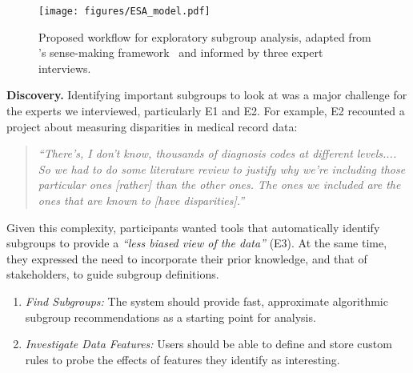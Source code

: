 \begin{figure}
    \centering
    \texttt{[image: figures/ESA\_model.pdf]}
    \caption{Proposed workflow for exploratory subgroup analysis, adapted from \citeauthor{pirolli_sensemaking_2005}'s sense-making framework~\cite{pirolli_sensemaking_2005} and informed by three expert interviews.}
    \label{fig:esa-model}
\end{figure}

\textbf{Discovery.} Identifying important subgroups to look at was a major challenge for the experts we interviewed, particularly E1 and E2.
For example, E2 recounted a project about measuring disparities in medical record data:
\begin{quote}
\textit{``There's, I don't know, thousands of diagnosis codes at different levels.... So we had to do some literature review to justify why we're including those particular ones [rather] than the other ones. The ones we included are the ones that are known to [have disparities].''}
\end{quote}
Given this complexity, participants wanted tools that automatically identify subgroups to provide a \textit{``less biased view of the data''} (E3).
At the same time, they expressed the need to incorporate their prior knowledge, and that of stakeholders, to guide subgroup definitions.

\begin{enumerate}[label={\bfseries T\arabic*.}, ref={\bfseries T\arabic*},itemsep=1ex]
    \setcounter{enumi}{\value{goalCounter}}
    \item \textit{Find Subgroups:} The system should provide fast, approximate algorithmic subgroup recommendations as a starting point for analysis. \label{task:find-subgroups}
    \item \textit{Investigate Data Features:} Users should be able to define and store custom rules to probe the effects of features they identify as interesting. \label{task:investigate-data-features}
    \setcounter{goalCounter}{\value{enumi}}
\end{enumerate}


